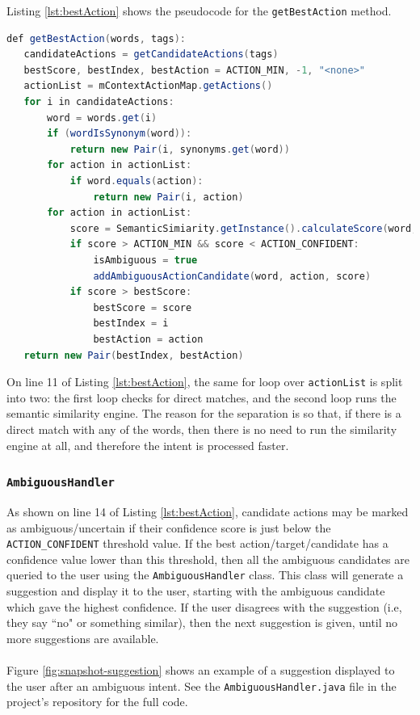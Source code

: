 \documentclass[11pt]{article}
\begin{document}
Listing \ref{lst:bestAction} shows the pseudocode for the \texttt{getBestAction} method.
\\
\begin{lstlisting}[language=Java, caption=getBestAction() pseudocode, label={lst:bestAction}]
def getBestAction(words, tags):
   candidateActions = getCandidateActions(tags)
   bestScore, bestIndex, bestAction = ACTION_MIN, -1, "<none>"
   actionList = mContextActionMap.getActions()
   for i in candidateActions:
       word = words.get(i)
       if (wordIsSynonym(word)):
           return new Pair(i, synonyms.get(word))
       for action in actionList:
           if word.equals(action):
               return new Pair(i, action)
       for action in actionList:
           score = SemanticSimiarity.getInstance().calculateScore(word, action)
           if score > ACTION_MIN && score < ACTION_CONFIDENT:
               isAmbiguous = true
               addAmbiguousActionCandidate(word, action, score)
           if score > bestScore:
               bestScore = score
               bestIndex = i
               bestAction = action
   return new Pair(bestIndex, bestAction)
\end{lstlisting}

On line 11 of Listing \ref{lst:bestAction}, the same for loop over \texttt{actionList} is split into two: the first loop checks for direct matches, and the second loop runs the semantic similarity engine. The reason for the separation is so that, if there is a direct match with any of the words, then there is no need to run the similarity engine at all, and therefore the intent is processed faster.

\subsubsection{\texttt{AmbiguousHandler}}

As shown on line 14 of Listing \ref{lst:bestAction}, candidate actions may be marked as ambiguous/uncertain if their confidence score is just below the \texttt{ACTION\_CONFIDENT} threshold value. If the best action/target/candidate has a confidence value lower than this threshold, then all the ambiguous candidates are queried to the user using the \texttt{AmbiguousHandler} class. This class will generate a suggestion and display it to the user, starting with the ambiguous candidate which gave the highest confidence. If the user disagrees with the suggestion (i.e, they say ``no" or something similar), then the next suggestion is given, until no more suggestions are available.
\\
\\
Figure \ref{fig:snapshot-suggestion} shows an example of a suggestion displayed to the user after an ambiguous intent. See the \texttt{AmbiguousHandler.java} file in the project's repository for the full code.
\end{document}
